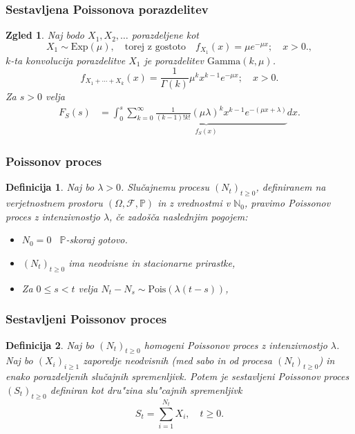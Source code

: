 \documentclass[handout]{beamer} %
\theoremstyle{plain}
\newtheorem{definicija}{Definicija}
\newtheorem{zgled}{Zgled}
\newcommand{\Prob}{\mathbb{P}}
\newcommand{\Pois}[1]{\text{Pois}(#1)}
\begin{document}
\begin{frame}
  \frametitle{Sestavljena Poissonova porazdelitev}
  \begin{zgled}
        Naj bodo $X_1, X_2, \dots$ porazdeljene kot
        \begin{equation*}
            X_1\sim\text{Exp}(\mu),\quad \text{torej z gostoto} \quad  f_{X_1}(x) = \mu e^{-\mu x}; \quad x>0.,
        \end{equation*}
        $k$-ta 
        konvolucija porazdelitve $X_1$ je porazdelitev $\text{Gamma}(k, \mu)$.
        \begin{equation*}
            f_{X_1 + \cdots + X_k}(x) = \frac{1}{\Gamma(k)}\mu^kx^{k-1}e^{-\mu x}; \quad x>0.
        \end{equation*}
        Za $s>0$ velja
        \begin{align*}
            F_{S}(s) 
            &= \int_0^s\underbrace{\sum_{k=0}^\infty \frac{1}{(k-1)!k!}(\mu\lambda)^kx^{k-1}e^{-(\mu x + \lambda)}}_{f_S(x)}dx.
        \end{align*}
  \end{zgled}
\end{frame}


\begin{frame}
  \frametitle{Poissonov proces}
  \begin{definicija}
    Naj bo $\lambda > 0$. Slučajnemu procesu $(N_t)_{t\geq 0}$, definiranem na verjetnostnem 
    prostoru $(\Omega, \mathcal{F}, \mathbb{P})$ in z vrednostmi v $\mathbb{N}_0$, pravimo 
    \textit{Poissonov proces} z intenzivnostjo $\lambda$, če zadošča naslednjim pogojem:
    \begin{itemize}
        \item $N_0 = 0$ \ $\Prob$-skoraj gotovo.
        \item $(N_t)_{t\geq 0}$ ima neodvisne in stacionarne prirastke,
        \item Za $0 \leq s < t$ velja $ N_t - N_s \sim\Pois{\lambda(t - s)}$,
    \end{itemize}
  \end{definicija}
\end{frame}

\begin{frame}
  \frametitle{Sestavljeni Poissonov proces}
  \begin{definicija}
    Naj bo $(N_t)_{t\geq0}$ homogeni Poissonov proces z intenzivnostjo $\lambda$. 
    Naj bo $(X_i)_{i\geq1}$ zaporedje neodvisnih (med sabo in od procesa $(N_t)_{t\geq0}$) in enako 
    porazdeljenih slučajnih spremenljivk. Potem je 
    \textit{sestavljeni Poissonov proces} $(S_t)_{t\geq0}$ definiran kot dru"zina
    slu"cajnih spremenljivk
    $$
        S_t = \sum_{i=1}^{N_t} X_i, \quad t\geq0.
    $$
    \label{def:CPP}
  \end{definicija}
\end{frame}
\end{document}

